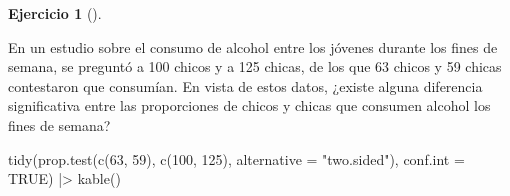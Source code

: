 \documentclass[
  a4paper,
]{scrreport}
\newenvironment{Shaded}{\begin{snugshade}}{\end{snugshade}}
\newcommand{\AttributeTok}[1]{\textcolor[rgb]{0.40,0.45,0.13}{#1}}
\newcommand{\ConstantTok}[1]{\textcolor[rgb]{0.56,0.35,0.01}{#1}}
\newcommand{\DecValTok}[1]{\textcolor[rgb]{0.68,0.00,0.00}{#1}}
\newcommand{\FunctionTok}[1]{\textcolor[rgb]{0.28,0.35,0.67}{#1}}
\newcommand{\NormalTok}[1]{\textcolor[rgb]{0.00,0.23,0.31}{#1}}
\newcommand{\SpecialCharTok}[1]{\textcolor[rgb]{0.37,0.37,0.37}{#1}}
\newcommand{\StringTok}[1]{\textcolor[rgb]{0.13,0.47,0.30}{#1}}
\theoremstyle{definition}
\newtheorem{exercise}{Ejercicio}[chapter]
\theoremstyle{remark}
\begin{document}
\begin{exercise}[]\protect\hypertarget{exr-contraste-proporcion-consumo-alcohol}{}\label{exr-contraste-proporcion-consumo-alcohol}

En un estudio sobre el consumo de alcohol entre los jóvenes durante los
fines de semana, se preguntó a 100 chicos y a 125 chicas, de los que 63
chicos y 59 chicas contestaron que consumían. En vista de estos datos,
¿existe alguna diferencia significativa entre las proporciones de chicos
y chicas que consumen alcohol los fines de semana?

\end{exercise}

\begin{tcolorbox}[enhanced jigsaw, breakable, opacityback=0, colbacktitle=quarto-callout-tip-color!10!white, colframe=quarto-callout-tip-color-frame, left=2mm, titlerule=0mm, coltitle=black, colback=white, bottomtitle=1mm, toptitle=1mm, opacitybacktitle=0.6, title=\textcolor{quarto-callout-tip-color}{\faLightbulb}\hspace{0.5em}{Solución}, leftrule=.75mm, bottomrule=.15mm, toprule=.15mm, rightrule=.15mm, arc=.35mm]

\begin{Shaded}
\begin{Highlighting}[]
\FunctionTok{tidy}\NormalTok{(}\FunctionTok{prop.test}\NormalTok{(}\FunctionTok{c}\NormalTok{(}\DecValTok{63}\NormalTok{, }\DecValTok{59}\NormalTok{), }\FunctionTok{c}\NormalTok{(}\DecValTok{100}\NormalTok{, }\DecValTok{125}\NormalTok{), }\AttributeTok{alternative =} \StringTok{"two.sided"}\NormalTok{), }\AttributeTok{conf.int =} \ConstantTok{TRUE}\NormalTok{) }\SpecialCharTok{|\textgreater{}} 
    \FunctionTok{kable}\NormalTok{()}
\end{Highlighting}
\end{Shaded}


\end{tcolorbox}
\end{document}
